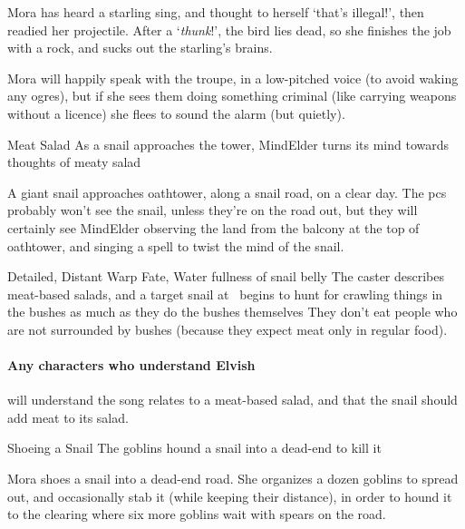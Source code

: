 Mora has heard a starling sing, and thought to herself `that's illegal!', then readied her \gls{projectile}.
After a `\emph{thunk}!', the bird lies dead, so she finishes the job with a rock, and sucks out the starling's brains.

Mora will happily speak with the troupe, in a low-pitched voice (to avoid waking any \glspl{ogre}), but if she sees them doing something criminal (like carrying weapons without a licence) she flees to sound the alarm (but quietly).


{Meat Salad}%
{As a snail approaches the tower, \gls{MindElder} turns its mind towards thoughts of meaty salad}%


A giant snail approaches \gls{oathtower}, along a snail road, on a clear day.
The \glspl{pc} probably won't see the snail, unless they're on the road out, but they will certainly see \gls{MindElder} observing the land from the balcony at the top of \gls{oathtower}, and singing a spell to twist the mind of the snail.

  {Detailed, Distant}%
  {Warp}%
  {Fate, Water}%
  {fullness of snail belly}%
  {The caster describes meat-based salads, and a target snail at \spellRange\ begins to hunt for crawling things in the bushes as much as they do the bushes themselves}%
  {They don't eat people who are not surrounded by bushes (because they expect meat only in regular food).}

\paragraph{Any characters who understand Elvish}
will understand the song relates to a meat-based salad, and that the snail should add meat to its salad.

{Shoeing a Snail}%
{The goblins hound a snail into a dead-end to kill it}%

Mora shoes a snail into a dead-end road.
She organizes a dozen goblins to spread out, and occasionally stab it (while keeping their distance), in order to hound it to the clearing where six more goblins wait with spears on the road.


